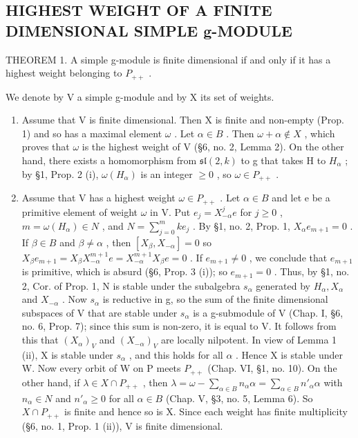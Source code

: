 \subsection{HIGHEST WEIGHT OF A FINITE DIMENSIONAL SIMPLE g-MODULE}

THEOREM 1. A simple g-module is finite dimensional if and only if it has a highest weight belonging to \(P_{++}\) .

We denote by V a simple g-module and by X its set of weights.

\begin{enumerate}
\def\labelenumi{\alph{enumi})}
\item
  Assume that V is finite dimensional. Then X is finite and non-empty (Prop. 1) and so has a maximal element \(\omega\) . Let \(\alpha \in B\) . Then \(\omega + \alpha \notin X\) , which proves that \(\omega\) is the highest weight of V (§6, no. 2, Lemma 2). On the other hand, there exists a homomorphism from \(\mathfrak{sl}(2, k)\) to g that takes H to \(H_{\alpha}\) ; by §1, Prop. 2 (i), \(\omega(H_{\alpha})\) is an integer \(\geq 0\) , so \(\omega \in P_{++}\) .
\item
  Assume that V has a highest weight \(\omega\in P_{++}\) . Let \(\alpha\in B\) and let e be a primitive element of weight \(\omega\) in V. Put \(e_{j}=X_{-\alpha}^{j}e\) for \(j\geq0\) , \(m=\omega(H_{\alpha})\in N\) , and \(N=\sum_{j=0}^{m}ke_{j}\) . By §1, no. 2, Prop. 1, \(X_{\alpha}e_{m+1}=0\) . If \(\beta\in B\) and \(\beta\neq\alpha\) , then \([X_{\beta},X_{-\alpha}]=0\) so \(X_{\beta}e_{m+1}=X_{\beta}X_{-\alpha}^{m+1}e=X_{-\alpha}^{m+1}X_{\beta}e=0\) . If \(e_{m+1}\neq0\) , we conclude that \(e_{m+1}\) is primitive, which is absurd (§6, Prop. 3 (i)); so \(e_{m+1}=0\) . Thus, by §1, no. 2, Cor. of Prop. 1, N is stable under the subalgebra \(s_{\alpha}\) generated by \(H_{\alpha},X_{\alpha}\) and \(X_{-\alpha}\) . Now \(s_{\alpha}\) is reductive in g, so the sum of the finite dimensional subspaces of V that are stable under \(s_{\alpha}\) is a g-submodule of V (Chap. I, §6, no. 6, Prop. 7); since this sum is non-zero, it is equal to V. It follows from this that \((X_{\alpha})_{V}\) and \((X_{-\alpha})_{V}\) are locally nilpotent. In view of Lemma 1 (ii), X is stable under \(s_{\alpha}\) , and this holds for all \(\alpha\) . Hence X is stable under W. Now every orbit of W on P meets \(P_{++}\) (Chap. VI, §1, no. 10). On the other hand, if \(\lambda\in X\cap P_{++}\) , then \(\lambda=\omega-\sum_{\alpha\in B}n_{\alpha}\alpha=\sum_{\alpha\in B}n'_{\alpha}\alpha\) with \(n_{\alpha}\in N\) and \(n'_{\alpha}\geq0\) for all \(\alpha\in B\) (Chap. V, §3, no. 5, Lemma 6). So \(X\cap P_{++}\) is finite and hence so is X. Since each weight has finite multiplicity (§6, no. 1, Prop. 1 (ii)), V is finite dimensional.
\end{enumerate}

